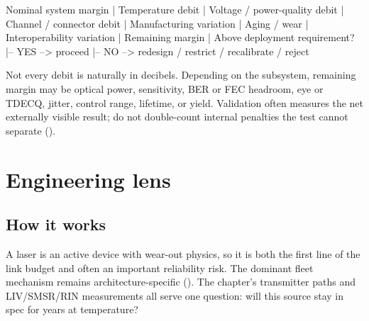 


\begin{dectree}
Nominal system margin
  |
Temperature debit
  |
Voltage / power-quality debit
  |
Channel / connector debit
  |
Manufacturing variation
  |
Aging / wear
  |
Interoperability variation
  |
Remaining margin
  |
Above deployment requirement?
  |-- YES --> proceed
  |-- NO  --> redesign / restrict / recalibrate / reject
\end{dectree}

Not every debit is naturally in decibels. Depending on the subsystem, remaining
margin may be optical power, sensitivity, BER or FEC headroom, eye or TDECQ,
jitter, control range, lifetime, or yield. Validation often measures the net
externally visible result; do not double-count internal penalties the test
cannot separate ().

\section{Engineering lens}
\label{sec:lasers-engineering-lens}

\subsection{How it works}

A laser is an active device with wear-out physics, so it is both the first line
of the link budget and often an important reliability risk. The dominant fleet
mechanism remains architecture-specific
(). The chapter's transmitter paths and
LIV/SMSR/RIN measurements all serve one question: will this source stay in
spec for years at temperature?

